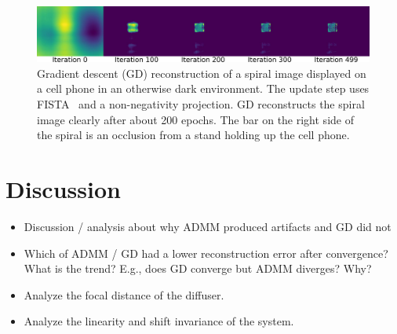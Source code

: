 \documentclass[final]{cvpr}
\begin{document}
\begin{figure}[t]
	\centering
	\includegraphics[width=1.0\linewidth]{images/gd-spiral-reconstruction-500iters}
	\caption{\label{fig:gd-spiral-reconstruction-500iters}
		Gradient descent (GD) reconstruction of a spiral image
		displayed on a cell phone in an otherwise dark environment.
		The update step uses FISTA~\cite{beck2009fast} and a
		non-negativity projection.
		GD reconstructs the spiral image clearly after about 200 epochs.
		The bar on the right side of the spiral is an occlusion from a
		stand holding up the cell phone.}
\end{figure}


\section{Discussion}

\begin{itemize}
	\item Discussion / analysis about why ADMM produced artifacts and GD
	      did not

	\item Which of ADMM / GD had a lower reconstruction error after
	      convergence?
	      What is the trend?
	      E.g., does GD converge but ADMM diverges?
	      Why?

	\item Analyze the focal distance of the diffuser.

	\item Analyze the linearity and shift invariance of the system.
\end{itemize}



\par\vfill\par

\clearpage
%
%
{\small
	
	
}

\clearpage
\end{document}
